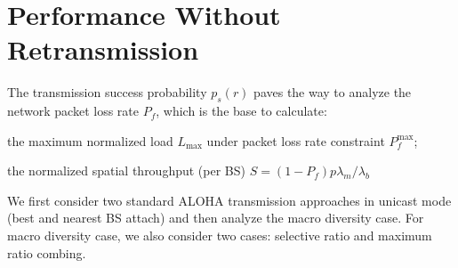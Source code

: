\section{Performance Without Retransmission}
\label{sec:op_over_infinite_plane}
The transmission success probability $p_s(r)$ paves the way to analyze the network packet loss rate $P_{f}$, which is the base to calculate:\begin{inparaenum}[1)]
	\item the maximum normalized load $L_{\text{max}}$ under packet loss rate constraint $P_{f}^{\text{max}}$;
	\item the normalized spatial throughput (per BS) $S = (1-P_{f}) p\lambda_{m}/ \lambda_{b}$
\end{inparaenum}
We first consider two standard ALOHA transmission approaches in unicast mode (best and nearest BS attach) and then analyze the macro diversity case. For macro diversity case, we also consider two cases: selective ratio and maximum ratio combing.
